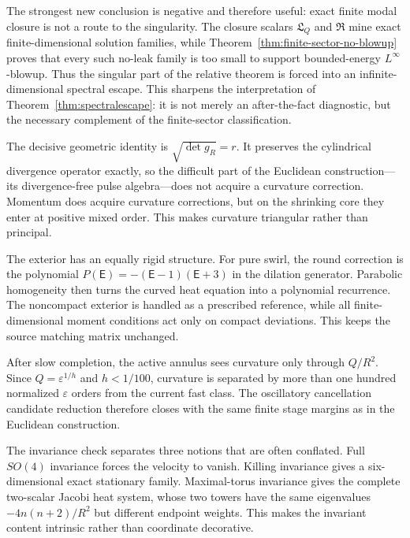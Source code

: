 \documentclass[aps,prd,reprint,superscriptaddress,nofootinbib,floatfix]{revtex4-2}
\theoremstyle{definition}
\theoremstyle{remark}
\begin{document}
\label{sec:discussion}

The strongest new conclusion is negative and therefore useful: exact finite modal closure is not a route to the singularity.  The closure scalars \(\mathfrak L_Q\) and \(\mathfrak R\) mine exact finite-dimensional solution families, while Theorem~\ref{thm:finite-sector-no-blowup} proves that every such no-leak family is too small to support bounded-energy \(L^\infty\)-blowup.  Thus the singular part of the relative theorem is forced into an infinite-dimensional spectral escape.  This sharpens the interpretation of Theorem~\ref{thm:spectralescape}: it is not merely an after-the-fact diagnostic, but the necessary complement of the finite-sector classification.



The decisive geometric identity is $\sqrt{\det g_R}=r$. It preserves the cylindrical divergence operator exactly, so the difficult part of the Euclidean construction---its divergence-free pulse algebra---does not acquire a curvature correction. Momentum does acquire curvature corrections, but on the shrinking core they enter at positive mixed order. This makes curvature triangular rather than principal.

The exterior has an equally rigid structure. For pure swirl, the round correction is the polynomial $P(\mathsf E)=-(\mathsf E-1)(\mathsf E+3)$ in the dilation generator. Parabolic homogeneity then turns the curved heat equation into a polynomial recurrence. The noncompact exterior is handled as a prescribed reference, while all finite-dimensional moment conditions act only on compact deviations. This keeps the source matching matrix unchanged.

After slow completion, the active annulus sees curvature only through $Q/R^2$. Since $Q=\varepsilon^{1/h}$ and $h<1/100$, curvature is separated by more than one hundred normalized $\varepsilon$ orders from the current fast class. The oscillatory cancellation candidate reduction therefore closes with the same finite stage margins as in the Euclidean construction.

The invariance check separates three notions that are often conflated.  Full $SO(4)$ invariance forces the velocity to vanish.  Killing invariance gives a six-dimensional exact stationary family.  Maximal-torus invariance gives the complete two-scalar Jacobi heat system, whose two towers have the same eigenvalues $-4n(n+2)/R^2$ but different endpoint weights.  This makes the invariant content intrinsic rather than coordinate decorative.
\end{document}
